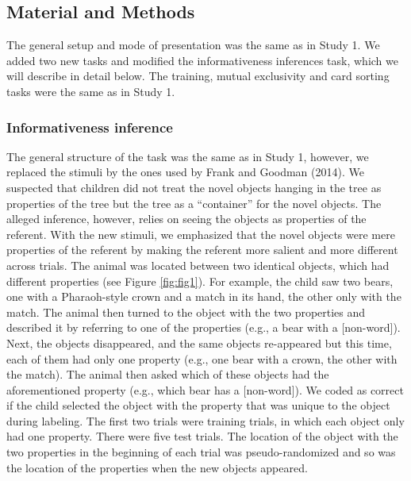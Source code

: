 \documentclass[
  man,floatsintext]{apa6}
\begin{document}
\hypertarget{material-and-methods-1}{%
\subsection{Material and Methods}\label{material-and-methods-1}}

The general setup and mode of presentation was the same as in Study 1. We added two new tasks and modified the informativeness inferences task, which we will describe in detail below. The training, mutual exclusivity and card sorting tasks were the same as in Study 1.

\hypertarget{informativeness-inference-1}{%
\subsubsection{Informativeness inference}\label{informativeness-inference-1}}

The general structure of the task was the same as in Study 1, however, we replaced the stimuli by the ones used by Frank and Goodman (2014). We suspected that children did not treat the novel objects hanging in the tree as properties of the tree but the tree as a ``container'' for the novel objects. The alleged inference, however, relies on seeing the objects as properties of the referent. With the new stimuli, we emphasized that the novel objects were mere properties of the referent by making the referent more salient and more different across trials. The animal was located between two identical objects, which had different properties (see Figure \ref{fig:fig1}). For example, the child saw two bears, one with a Pharaoh-style crown and a match in its hand, the other only with the match. The animal then turned to the object with the two properties and described it by referring to one of the properties (e.g., a bear with a {[}non-word{]}). Next, the objects disappeared, and the same objects re-appeared but this time, each of them had only one property (e.g., one bear with a crown, the other with the match). The animal then asked which of these objects had the aforementioned property (e.g., which bear has a {[}non-word{]}). We coded as correct if the child selected the object with the property that was unique to the object during labeling. The first two trials were training trials, in which each object only had one property. There were five test trials. The location of the object with the two properties in the beginning of each trial was pseudo-randomized and so was the location of the properties when the new objects appeared.
\end{document}
